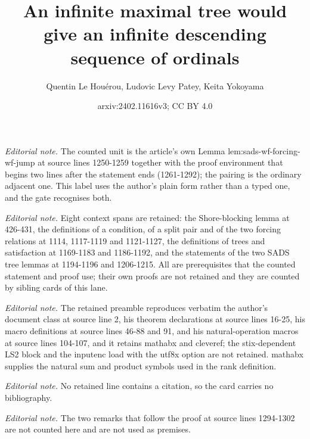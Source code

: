 \documentclass{article}
\title{An infinite maximal tree would give an infinite descending sequence of ordinals}
\author{Quentin Le Houérou, Ludovic Levy Patey, Keita Yokoyama}
\date{arxiv:2402.11616v3; CC BY 4.0}
\numberwithin{theorem}{section}
\begin{document}
\maketitle
\noindent\textit{Editorial note.} The counted unit is the article's own Lemma lem:sads-wf-forcing-wf-jump at source lines 1250-1259 together with the proof environment that begins two lines after the statement ends (1261-1292); the pairing is the ordinary adjacent one. This label uses the author's plain form rather than a typed one, and the gate recognises both.\par\medskip
\noindent\textit{Editorial note.} Eight context spans are retained: the Shore-blocking lemma at 426-431, the definitions of a condition, of a split pair and of the two forcing relations at 1114, 1117-1119 and 1121-1127, the definitions of trees and satisfaction at 1169-1183 and 1186-1192, and the statements of the two SADS tree lemmas at 1194-1196 and 1206-1215. All are prerequisites that the counted statement and proof use; their own proofs are not retained and they are counted by sibling cards of this lane.\par\medskip
\noindent\textit{Editorial note.} The retained preamble reproduces verbatim the author's document class at source line 2, his theorem declarations at source lines 16-25, his macro definitions at source lines 46-88 and 91, and his natural-operation macros at source lines 104-107, and it retains mathabx and cleveref; the stix-dependent LS2 block and the inputenc load with the utf8x option are not retained. mathabx supplies the natural sum and product symbols used in the rank definition.\par\medskip
\noindent\textit{Editorial note.} No retained line contains a citation, so the card carries no bibliography.\par\medskip
\noindent\textit{Editorial note.} The two remarks that follow the proof at source lines 1294-1302 are not counted here and are not used as premises.\par\medskip
\end{document}
